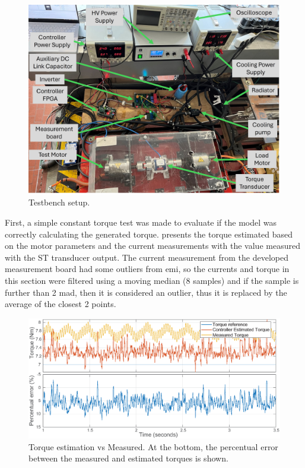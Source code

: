 \begin{figure}[!htb]
	\centering
	\includegraphics[width=.8\textwidth]{Figures/testbench_setup.jpg}
	\caption[Testbench setup.]{Testbench setup.}
	\label{fig:testbench_steup} %
\end{figure}

First, a simple constant torque test was made to evaluate if the model was correctly calculating the generated torque.  presents the torque estimated based on the motor parameters and the current measurements with the value measured with the ST transducer output. The current measurement from the developed measurement board had some outliers from \gls{emi}, so the currents and torque in this section were filtered using a moving median (8 samples) and if the sample is further than 2 \gls{mad}, then it is considered an outlier, thus it is replaced by the average of the closest 2 points.

\begin{figure}[!htb]
	\centering
	\includegraphics[width=0.8\linewidth]{Figures/constantTq.eps}
	\caption[Torque estimation vs Measured. In the bottom the percentual error between the measured and estimated torques is shown.]{Torque estimation vs Measured. At the bottom, the percentual error between the measured and estimated torques is shown.}
	\label{fig:constant_tq} %
\end{figure}


